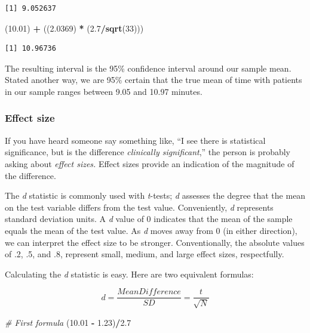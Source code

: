 \documentclass[
  11pt,
]{book}
\newenvironment{Shaded}{\begin{snugshade}}{\end{snugshade}}
\newcommand{\CommentTok}[1]{\textcolor[rgb]{0.37,0.37,0.37}{\textit{#1}}}
\newcommand{\DecValTok}[1]{\textcolor[rgb]{0.06,0.06,0.06}{#1}}
\newcommand{\FloatTok}[1]{\textcolor[rgb]{0.06,0.06,0.06}{#1}}
\newcommand{\FunctionTok}[1]{\textcolor[rgb]{0.27,0.27,0.27}{\textbf{#1}}}
\newcommand{\NormalTok}[1]{#1}
\newcommand{\SpecialCharTok}[1]{\textcolor[rgb]{0.43,0.43,0.43}{\textbf{#1}}}
\begin{document}
\begin{verbatim}
[1] 9.052637
\end{verbatim}

\begin{Shaded}
\begin{Highlighting}[]
\NormalTok{(}\FloatTok{10.01}\NormalTok{) }\SpecialCharTok{+}\NormalTok{ ((}\FloatTok{2.0369}\NormalTok{) }\SpecialCharTok{*}\NormalTok{ (}\FloatTok{2.7}\SpecialCharTok{/}\FunctionTok{sqrt}\NormalTok{(}\DecValTok{33}\NormalTok{)))}
\end{Highlighting}
\end{Shaded}

\begin{verbatim}
[1] 10.96736
\end{verbatim}

The resulting interval is the 95\% confidence interval around our sample mean. Stated another way, we are 95\% certain that the true mean of time with patients in our sample ranges between 9.05 and 10.97 minutes.

\hypertarget{effect-size}{%
\subsubsection{Effect size}\label{effect-size}}

If you have heard someone say something like, ``I see there is statistical significance, but is the difference \emph{clinically significant},'' the person is probably asking about \emph{effect sizes.} Effect sizes provide an indication of the magnitude of the difference.

The \emph{d} statistic is commonly used with \emph{t}-tests; \emph{d} assesses the degree that the mean on the test variable differs from the test value. Conveniently, \emph{d} represents standard deviation units. A \emph{d} value of 0 indicates that the mean of the sample equals the mean of the test value. As \emph{d} moves away from 0 (in either direction), we can interpret the effect size to be stronger. Conventionally, the absolute values of .2, .5, and .8, represent small, medium, and large effect sizes, respectfully.

Calculating the \emph{d} statistic is easy. Here are two equivalent formulas:

\[d = \frac{Mean Difference}{SD}=\frac{t}{\sqrt{N}}\]

\begin{Shaded}
\begin{Highlighting}[]
\CommentTok{\# First formula}
\NormalTok{(}\FloatTok{10.01} \SpecialCharTok{{-}} \FloatTok{1.23}\NormalTok{)}\SpecialCharTok{/}\FloatTok{2.7}
\end{Highlighting}
\end{Shaded}
\end{document}
